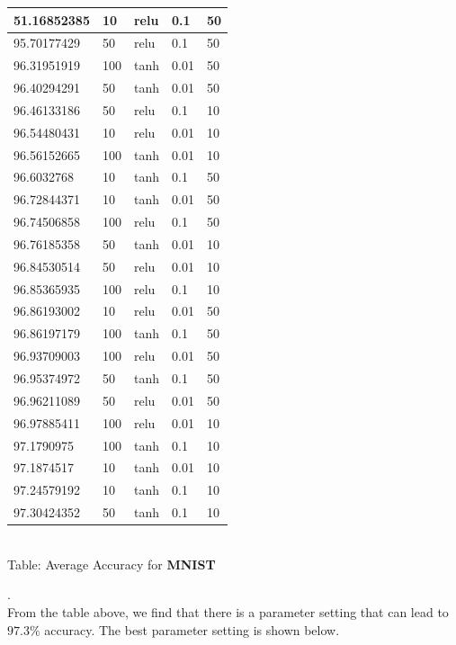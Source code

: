 \begin{enumerate}
\begin{enumerate}
\begin{enumerate}
\begin{enumerate}
\begin{center}
\begin{tabular}{|l|l|l|l|l|}
		51.16852385 & 10  & relu & 0.1  & 50 \\ \hline
		95.70177429 & 50  & relu & 0.1  & 50 \\ \hline
		96.31951919 & 100 & tanh & 0.01 & 50 \\ \hline
		96.40294291 & 50  & tanh & 0.01 & 50 \\ \hline
		96.46133186 & 50  & relu & 0.1  & 10 \\ \hline
		96.54480431 & 10  & relu & 0.01 & 10 \\ \hline
		96.56152665 & 100 & tanh & 0.01 & 10 \\ \hline
		96.6032768  & 10  & tanh & 0.1  & 50 \\ \hline
		96.72844371 & 10  & tanh & 0.01 & 50 \\ \hline
		96.74506858 & 100 & relu & 0.1  & 50 \\ \hline
		96.76185358 & 50  & tanh & 0.01 & 10 \\ \hline
		96.84530514 & 50  & relu & 0.01 & 10 \\ \hline
		96.85365935 & 100 & relu & 0.1  & 10 \\ \hline
		96.86193002 & 10  & relu & 0.01 & 50 \\ \hline
		96.86197179 & 100 & tanh & 0.1  & 50 \\ \hline
		96.93709003 & 100 & relu & 0.01 & 50 \\ \hline
		96.95374972 & 50  & tanh & 0.1  & 50 \\ \hline
		96.96211089 & 50  & relu & 0.01 & 50 \\ \hline
		96.97885411 & 100 & relu & 0.01 & 10 \\ \hline
		97.1790975  & 100 & tanh & 0.1  & 10 \\ \hline
		97.1874517  & 10  & tanh & 0.01 & 10 \\ \hline
		97.24579192 & 10  & tanh & 0.1  & 10 \\ \hline
		97.30424352 & 50  & tanh & 0.1  & 10 \\ \hline
		\end{tabular}
		\\Table: Average Accuracy for \textbf{MNIST}\\
		\end{center}
		.\\
		From the table above, we find that there is a parameter setting that can lead to $97.3\%$ accuracy. The best parameter setting is shown below.
		\begin{center}
		\begin{tabular}{|l|l|l|l|l|}

\end{tabular}
\end{center}
\end{enumerate}
\end{enumerate}
\end{enumerate}
\end{enumerate}
